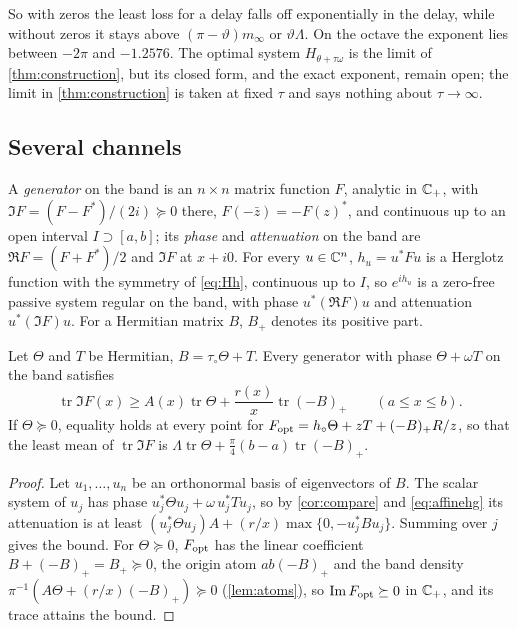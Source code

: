 So with zeros the least loss for a delay falls off exponentially in the
delay, while without zeros it stays above $(\pi-\vartheta)m_\infty$ or
$\vartheta\Lambda$. On the octave the exponent lies between $-2\pi$ and
$-1.2576$. The optimal system $H_{\theta+\tau\omega}$ is the limit of
\cref{thm:construction}, but its closed form, and the exact exponent, remain
open; the limit in \cref{thm:construction} is taken at fixed $\tau$ and says
nothing about $\tau\to\infty$.

\subsection{Several channels}\label{ssec:channels}

A \emph{generator} on the band is an $n\times n$ matrix function $F$,
analytic in $\Cp$, with $\Im F=(F-F^*)/(2i)\succeq0$ there,
$F(-\bar z)=-F(z)^*$, and continuous up to an open interval $I\supset[a,b]$;
its \emph{phase} and \emph{attenuation} on the band are $\Re F=(F+F^*)/2$ and
$\Im F$ at $x+i0$. For every $u\in\C^n$, $h_u=u^*Fu$ is a Herglotz function
with the symmetry of \eqref{eq:Hh}, continuous up to $I$, so $e^{ih_u}$ is
a zero-free passive system regular on the band, with phase $u^*(\Re F)u$
and attenuation $u^*(\Im F)u$. For a Hermitian matrix $B$, $B_+$ denotes its
positive part.

\begin{theorem}\label{thm:trace}
Let $\Theta$ and $T$ be Hermitian, $B=\tau_\circ\Theta+T$. Every generator
with phase $\Theta+\omega T$ on the band satisfies
\[
\operatorname{tr}\Im F(x)\ge A(x)\operatorname{tr}\Theta+\frac{r(x)}x\operatorname{tr}(-B)_+
\qquad(a\le x\le b).
\]
If $\Theta\succeq0$, equality holds at every point for
$F_{\rm opt}=h_\circ\Theta+zT+(-B)_+R/z$, so that the least mean of
$\operatorname{tr}\Im F$ is
$\Lambda\operatorname{tr}\Theta+\frac\pi4(b-a)\operatorname{tr}(-B)_+$.
\end{theorem}

\begin{proof}
Let $u_1,\dots,u_n$ be an orthonormal basis of eigenvectors of $B$. The
scalar system of $u_j$ has phase $u_j^*\Theta u_j+\omega\,u_j^*Tu_j$, so by
\cref{cor:compare} and \eqref{eq:affinehg} its attenuation is at least
$(u_j^*\Theta u_j)A+(r/x)\max\{0,-u_j^*Bu_j\}$. Summing over $j$ gives the
bound. For $\Theta\succeq0$, $F_{\rm opt}$ has the linear coefficient
$B+(-B)_+=B_+\succeq0$, the origin atom $ab(-B)_+$ and the band density
$\pi^{-1}(A\Theta+(r/x)(-B)_+)\succeq0$ (\cref{lem:atoms}), so
$\Im F_{\rm opt}\succeq0$ in $\Cp$, and its trace attains the bound.
\end{proof}

